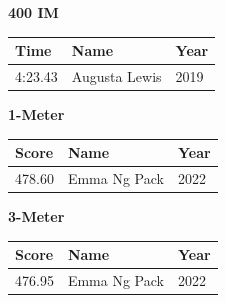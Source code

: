 \vspace{1.2em}
\noindent\begin{minipage}[t]{0.48\textwidth}
\centering
\textbf{\textcolor{teamprimary}{400 IM}}\par
\vspace{0.5em}
\centering
\small
\renewcommand{\arraystretch}{1.0}
\setlength{\tabcolsep}{4pt}
\begin{tabular}{@{}p{1.8cm}p{3.0cm}p{1.0cm}@{}}
\toprule
\textbf{Time} & \textbf{Name} & \textbf{Year} \\
\midrule
4:23.43 & Augusta Lewis & 2019 \\
\bottomrule
\end{tabular}
\end{minipage}
\hfill
\begin{minipage}[t]{0.48\textwidth}
\centering
\textbf{\textcolor{teamprimary}{1-Meter}}\par
\vspace{0.5em}
\centering
\small
\renewcommand{\arraystretch}{1.0}
\setlength{\tabcolsep}{4pt}
\begin{tabular}{@{}p{1.8cm}p{3.0cm}p{1.0cm}@{}}
\toprule
\textbf{Score} & \textbf{Name} & \textbf{Year} \\
\midrule
478.60 & Emma Ng Pack & 2022 \\
\bottomrule
\end{tabular}
\end{minipage}
\vspace{1.2em}
\noindent\begin{minipage}[t]{0.98\textwidth}
\centering
\textbf{\textcolor{teamprimary}{3-Meter}}\par
\vspace{0.5em}
\centering
\small
\renewcommand{\arraystretch}{1.0}
\setlength{\tabcolsep}{4pt}
\begin{tabular}{@{}p{1.8cm}p{3.0cm}p{1.0cm}@{}}
\toprule
\textbf{Score} & \textbf{Name} & \textbf{Year} \\
\midrule
476.95 & Emma Ng Pack & 2022 \\
\bottomrule
\end{tabular}
\end{minipage}
\clearpage
